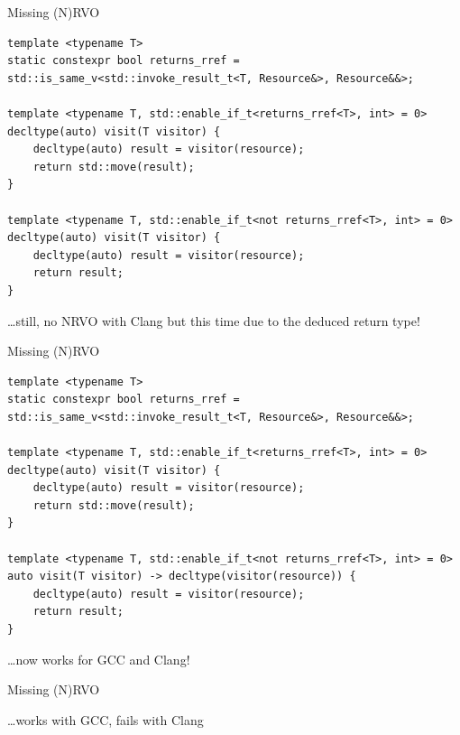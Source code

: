 \documentclass[compress,aspectratio=1610]{beamer}
\newcommand{\inputcpplisting}[1]{}
\begin{document}
\begin{frame}[fragile]{Missing (N)RVO}
    \begin{lstlisting}
template <typename T>
static constexpr bool returns_rref = std::is_same_v<std::invoke_result_t<T, Resource&>, Resource&&>;

template <typename T, std::enable_if_t<returns_rref<T>, int> = 0>
decltype(auto) visit(T visitor) {
    decltype(auto) result = visitor(resource);
    return std::move(result);
}

template <typename T, std::enable_if_t<not returns_rref<T>, int> = 0>
decltype(auto) visit(T visitor) {
    decltype(auto) result = visitor(resource);
    return result;
}
    \end{lstlisting}

    \hfill \ldots still, no NRVO with Clang but this time due to the deduced return type!
\end{frame}

\begin{frame}[fragile]{Missing (N)RVO}
    \begin{lstlisting}
template <typename T>
static constexpr bool returns_rref = std::is_same_v<std::invoke_result_t<T, Resource&>, Resource&&>;

template <typename T, std::enable_if_t<returns_rref<T>, int> = 0>
decltype(auto) visit(T visitor) {
    decltype(auto) result = visitor(resource);
    return std::move(result);
}

template <typename T, std::enable_if_t<not returns_rref<T>, int> = 0>
auto visit(T visitor) -> decltype(visitor(resource)) {
    decltype(auto) result = visitor(resource);
    return result;
}
    \end{lstlisting}

    \hfill \ldots now works for GCC and Clang!
\end{frame}

\begin{frame}
    \inputcpplisting{snippet17}
\end{frame}

\begin{frame}
\end{frame}

\begin{frame}[fragile]{Missing (N)RVO}
    \inputcpplisting{snippet19a}

    \hfill \ldots works with GCC, fails with Clang
\end{frame}
\end{document}
